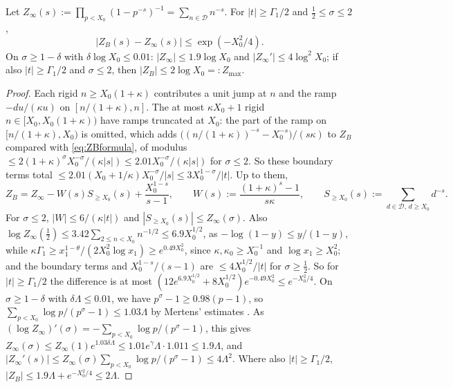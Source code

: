 \begin{lemma}\label{lem:ZB}
Let $Z_\infty(s):=\prod_{p<X_0}(1-p^{-s})^{-1}=\sum_{n\in\mathcal D}n^{-s}$. For $|t|\ge\Gamma_1/2$ and $\tfrac12\le\sigma\le2$,
\[
  |Z_B(s)-Z_\infty(s)|\le\exp(-X_0^2/4).
\]
On $\sigma\ge1-\delta$ with $\delta\log X_0\le0.01$: $|Z_\infty|\le1.9\log X_0$ and $|Z_\infty'|\le4\log^2X_0$; if also
$|t|\ge\Gamma_1/2$ and $\sigma\le2$, then $|Z_B|\le2\log X_0=:Z_{\max}$.
\end{lemma}
\begin{proof}
Each rigid $n\ge X_0(1+\kappa)$ contributes a unit jump at $n$ and the ramp $-du/(\kappa u)$ on $[n/(1+\kappa),n]$. The at most
$\kappa X_0+1$ rigid $n\in[X_0,X_0(1+\kappa))$ have ramps truncated at $X_0$: the part of the ramp on $[n/(1+\kappa),X_0)$ is
omitted, which adds $\bigl((n/(1+\kappa))^{-s}-X_0^{-s}\bigr)/(s\kappa)$ to $Z_B$ compared with \eqref{eq:ZBformula}, of modulus
$\le2(1+\kappa)^{\sigma}X_0^{-\sigma}/(\kappa|s|)\le2.01X_0^{-\sigma}/(\kappa|s|)$ for $\sigma\le2$. So these boundary terms total
$\le2.01(X_0+1/\kappa)X_0^{-\sigma}/|s|\le3X_0^{1-\sigma}/|t|$. Up to them,
\begin{equation}\label{eq:ZBformula}
  Z_B=Z_\infty-W(s)S_{\ge X_0}(s)+\frac{X_0^{1-s}}{s-1},\qquad W(s):=\frac{(1+\kappa)^s-1}{s\kappa},\qquad
  S_{\ge X_0}(s):=\sum_{d\in\mathcal D,\,d\ge X_0}d^{-s}.
\end{equation}
For $\sigma\le2$, $|W|\le6/(\kappa|t|)$ and $|S_{\ge X_0}(s)|\le Z_\infty(\sigma)$. Also $\log Z_\infty(\frac12)\le3.42\sum_{2\le n<X_0}n^{-1/2}
\le6.9X_0^{1/2}$, as $-\log(1-y)\le y/(1-y)$, while $\kappa\Gamma_1\ge x_1^{1-\theta}/(2X_0^2\log x_1)\ge e^{0.49X_0^2}$, since
$\kappa,\kappa_0\ge X_0^{-1}$ and $\log x_1\ge X_0^2$; and the boundary terms and $X_0^{1-s}/(s-1)$ are $\le4X_0^{1/2}/|t|$ for
$\sigma\ge\frac12$. So for $|t|\ge\Gamma_1/2$ the difference is at most $(12e^{6.9X_0^{1/2}}+8X_0^{1/2})e^{-0.49X_0^2}\le e^{-X_0^2/4}$.
On $\sigma\ge1-\delta$ with $\delta\Lambda\le0.01$, we have $p^{\sigma}-1\ge0.98(p-1)$, so
$\sum_{p<X_0}\log p/(p^{\sigma}-1)\le1.03\Lambda$ by Mertens' estimates \cite{RosserSchoenfeld1962}. As
$(\log Z_\infty)'(\sigma)=-\sum_{p<X_0}\log p/(p^{\sigma}-1)$, this gives
$Z_\infty(\sigma)\le Z_\infty(1)e^{1.03\delta\Lambda}\le1.01e^{\gamma}\Lambda\cdot1.011\le1.9\Lambda$, and
$|Z_\infty'(s)|\le Z_\infty(\sigma)\sum_{p<X_0}\log p/(p^{\sigma}-1)\le4\Lambda^2$. Where also $|t|\ge\Gamma_1/2$,
$|Z_B|\le1.9\Lambda+e^{-X_0^2/4}\le2\Lambda$.
\end{proof}

